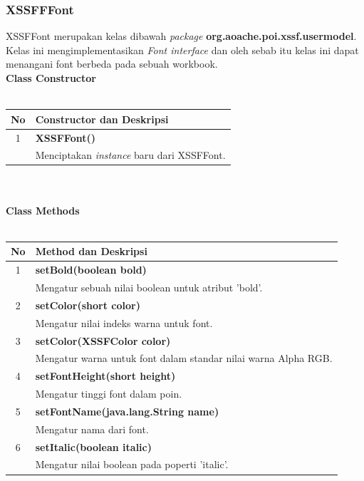 \subsubsection{XSSFFFont}
XSSFFont merupakan kelas dibawah \textit{package} \textbf{org.aoache.poi.xssf.usermodel}. Kelas ini mengimplementasikan \textit{Font interface} dan oleh sebab itu kelas ini dapat menangani font berbeda pada sebuah workbook.\cite{tutpoint}
\\
\noindent \textbf{Class Constructor}\\ \\
	\begin{tabular}{|c|p{12cm}|}
		\hline
		\textbf{No} & \textbf{Constructor dan Deskripsi} \\ \hline \hline
		1 & \textbf{XSSFFont()}\\
			&	Menciptakan \textit{instance} baru dari XSSFFont.\\ \hline
	\end{tabular}
\\ \\
\noindent \textbf{Class Methods}\\ \\
	\begin{tabular}{|c|p{12cm}|}
		\hline
		\textbf{No} & \textbf{Method dan Deskripsi} \\ \hline \hline
		1 & \textbf{setBold(boolean bold)}\\
			&	Mengatur sebuah nilai boolean untuk atribut 'bold'.\\ \hline
		2 & \textbf{setColor(short color)}\\
			&	Mengatur nilai indeks warna untuk font.\\ \hline
		3 & \textbf{setColor(XSSFColor color)}\\
			&	Mengatur warna untuk font dalam standar nilai warna Alpha RGB.\\ \hline
		4 & \textbf{setFontHeight(short height)}\\
			&	Mengatur tinggi font dalam poin.\\ \hline
		5 & \textbf{setFontName(java.lang.String name)}\\
			&	Mengatur nama dari font.\\ \hline
		6 & \textbf{setItalic(boolean italic)}\\
			&	Mengatur nilai boolean pada poperti 'italic'.\\ \hline					
	\end{tabular}
	
